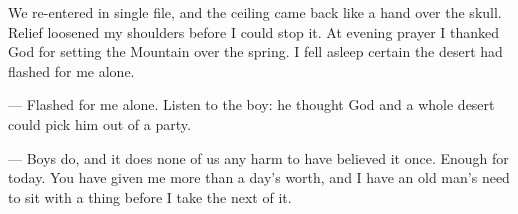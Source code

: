 We re-entered in single file, and the ceiling came back like a hand over the skull. Relief loosened my shoulders before I could stop it. At evening prayer I thanked God for setting the Mountain over the spring. I fell asleep certain the desert had flashed for me alone.\par

\begin{room}

--- Flashed for me alone. Listen to the boy: he thought God and a whole desert could pick him out of a party.

--- Boys do, and it does none of us any harm to have believed it once. Enough for today. You have given me more than a day's worth, and I have an old man's need to sit with a thing before I take the next of it.

\end{room}

